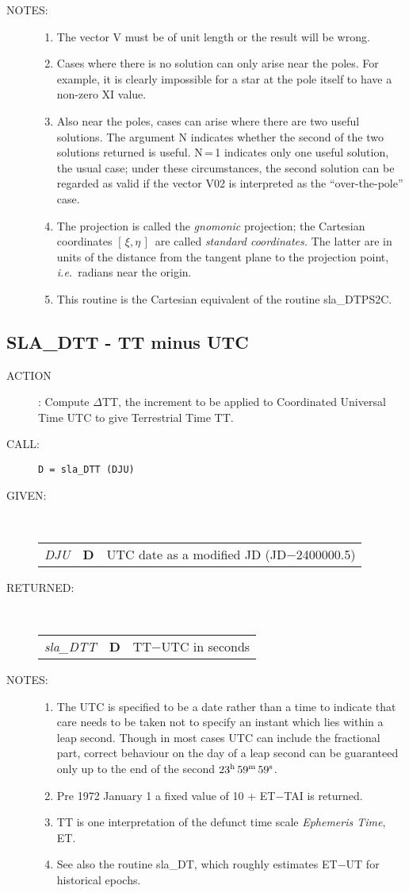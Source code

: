 \documentclass[11pt,twoside]{article}
\newcommand{\xlabel}[1]{}
\newcommand{\xieta}     {$[\,\xi,\eta\,]$}
\newcommand{\routine}[3]
{\hbadness=10000
  \vbox
  {
    \rule{\textwidth}{0.3mm}\\
    {\Large {\bf #1} \hfill #2 \hfill {\bf #1}}\\
    \setlength{\oldspacing}{\topsep}
    \setlength{\topsep}{0.3ex}
    \begin{description}
      #3
    \end{description}
    \setlength{\topsep}{\oldspacing}
  }
}
\renewcommand{\routine}[3]
   {
      \subsection{#1\xlabel{#1} - #2\label{#1}}
       \begin{description}
         #3
       \end{description}
   }
\newcommand{\action}[1]
{\item[ACTION]: #1}
\newcommand{\action}[1]
   {\item[ACTION:] #1}
\newcommand{\call}[1]
{\item[CALL]: \hspace{0.4em}{\tt #1}}
\newlength{\oldspacing}
\renewcommand{\call}[1]
   {
    \item[CALL:] {\tt #1}
   }
\newcommand{\args}[2]
{
  \goodbreak
  \setlength{\oldspacing}{\topsep}
  \setlength{\topsep}{0.3ex}
  \begin{description}
  \item[#1]:\\[1.5ex]
    \begin{tabular}{p{7em}p{6em}p{22em}}
      #2
    \end{tabular}
  \end{description}
  \setlength{\topsep}{\oldspacing}
}
\renewcommand{\args}[2]
   {
     \begin{description}
        \item[#1:]\\
        \begin{tabular}{p{7em}p{6em}l}
           #2
        \end{tabular}
     \end{description}
   }
\newcommand{\spec}[3]
{
  {\em {#1}} & {\bf \mbox{#2}} & {#3}
}
\newcommand{\notes}[1]
{
  \goodbreak
  \setlength{\oldspacing}{\topsep}
  \setlength{\topsep}{0.3ex}
  \begin{description}
    \item[NOTES]:
        #1
  \end{description}
  \setlength{\topsep}{\oldspacing}
}
\renewcommand{\notes}[1]
   {
      \begin{description}
         \item[NOTES:]
            #1
      \end{description}
   }
\begin{document}
\notes
{
 \begin{enumerate}
  \item The vector V must be of unit length or the result will be wrong.
  \item Cases where there is no solution can only arise near the poles.
        For example, it is clearly impossible for a star at the pole
        itself to have a non-zero XI value.
  \item Also near the poles, cases can arise where there are two useful
        solutions.  The argument N indicates whether the second of the
        two solutions returned is useful.
        N\,=\,1
        indicates only one useful solution, the usual case;  under these
        circumstances, the second solution can be regarded as valid if
        the vector V02 is interpreted as the ``over-the-pole'' case.
  \item The projection is called the {\it gnomonic}\/ projection;  the
        Cartesian coordinates \xieta\ are called
        {\it standard coordinates.}\/  The latter
        are in units of the distance from the tangent plane to the projection
        point, {\it i.e.}\ radians near the origin.
  \item This routine is the Cartesian equivalent of the routine sla\_DTPS2C.
 \end{enumerate}
}
\routine{SLA\_DTT}{TT minus UTC}
{
 \action{Compute $\Delta$TT, the increment to be applied to
         Coordinated Universal Time UTC to give
         Terrestrial Time TT.}
 \call{D~=~sla\_DTT (DJU)}
}
\args{GIVEN}
{
 \spec{DJU}{D}{UTC date as a modified JD (JD$-$2400000.5)}
}
\args{RETURNED}
{
 \spec{sla\_DTT}{D}{TT$-$UTC in seconds}
}
\notes
{
 \begin{enumerate}
  \item The UTC is specified to be a date rather than a time to indicate
        that care needs to be taken not to specify an instant which lies
        within a leap second.  Though in most cases UTC can include the
        fractional part, correct behaviour on the day of a leap second
        can be guaranteed only up to the end of the second
        $23^{\rm h}\,59^{\rm m}\,59^{\rm s}$.
  \item Pre 1972 January 1 a fixed value of 10 + ET$-$TAI is returned.
  \item TT is one interpretation of the defunct time scale
        {\it Ephemeris Time}, ET.
  \item See also the routine sla\_DT, which roughly estimates ET$-$UT for
        historical epochs.
 \end{enumerate}
}
\end{document}
